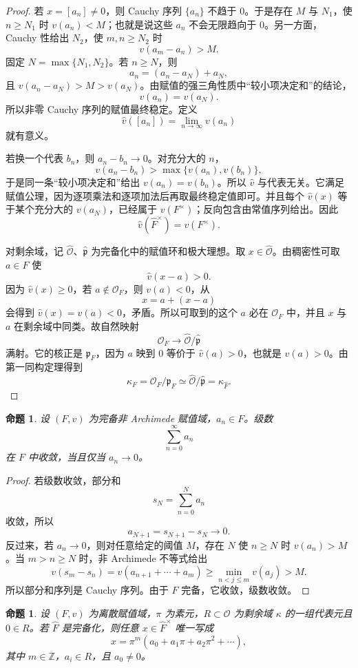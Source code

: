 \documentclass[11pt,a4paper,openany]{ctexbook}
\numberwithin{equation}{chapter}
\newcommand{\Z}{\mathbb{Z}}
\theoremstyle{plain}
\newtheorem{proposition}[theorem]{命题}
\theoremstyle{definition}
\theoremstyle{remark}
\begin{document}
\begin{proof}
若 $x=[a_n]\ne0$，则 Cauchy 序列 $\{a_n\}$ 不趋于 $0$。于是存在 $M$ 与 $N_1$，使 $n\ge N_1$ 时 $v(a_n)<M$；也就是说这些 $a_n$ 不会无限趋向于 $0$。另一方面，Cauchy 性给出 $N_2$，使 $m,n\ge N_2$ 时
\[
v(a_m-a_n)>M.
\]
固定 $N=\max\{N_1,N_2\}$。若 $n\ge N$，则
\[
a_n=(a_n-a_N)+a_N,
\]
且 $v(a_n-a_N)>M>v(a_N)$。由赋值的强三角性质中“较小项决定和”的结论，
\[
v(a_n)=v(a_N).
\]
所以非零 Cauchy 序列的赋值最终稳定。定义
\[
\widehat v([a_n])=\lim_{n\to\infty}v(a_n)
\]
就有意义。

若换一个代表 $b_n$，则 $a_n-b_n\to0$。对充分大的 $n$，
\[
v(a_n-b_n)>\max\{v(a_n),v(b_n)\},
\]
于是同一条“较小项决定和”给出 $v(a_n)=v(b_n)$。所以 $\widehat v$ 与代表无关。它满足赋值公理，因为逐项乘法和逐项加法后再取最终稳定值即可。并且每个
\(\widehat v(x)\) 等于某个充分大的 $v(a_N)$，已经属于 $v(F^\times)$；反向包含由常值序列给出。因此
\[
\widehat v(\widehat F^\times)=v(F^\times).
\]

对剩余域，记 $\widehat{\mathcal O}$、$\widehat{\mathfrak p}$ 为完备化中的赋值环和极大理想。取
$x\in\widehat{\mathcal O}$。由稠密性可取 $a\in F$ 使
\[
\widehat v(x-a)>0.
\]
因为 $\widehat v(x)\ge0$，若 $a\notin\mathcal O_F$，则 $v(a)<0$，从
\[
x=a+(x-a)
\]
会得到 $\widehat v(x)=v(a)<0$，矛盾。所以可取到的这个 $a$ 必在
\(\mathcal O_F\) 中，并且 $x$ 与 $a$ 在剩余域中同类。故自然映射
\[
\mathcal O_F\longrightarrow \widehat{\mathcal O}/\widehat{\mathfrak p}
\]
满射。它的核正是 $\mathfrak p_F$，因为 $a$ 映到 $0$ 等价于
\(\widehat v(a)>0\)，也就是 \(v(a)>0\)。由第一同构定理得到
\[
\kappa_F=\mathcal O_F/\mathfrak p_F\simeq
\widehat{\mathcal O}/\widehat{\mathfrak p}=\kappa_{\widehat F}.
\]
\end{proof}

\begin{proposition}
设 $(F,v)$ 为完备非 Archimede 赋值域，$a_n\in F$。级数
\[
\sum_{n=0}^\infty a_n
\]
在 $F$ 中收敛，当且仅当 $a_n\to0$。
\end{proposition}

\begin{proof}
若级数收敛，部分和
\[
s_N=\sum_{n=0}^N a_n
\]
收敛，所以
\[
a_{N+1}=s_{N+1}-s_N\to0.
\]
反过来，若 $a_n\to0$，则对任意给定的阈值 $M$，存在 $N$ 使 $n\ge N$ 时
$v(a_n)>M$。当 $m>n\ge N$ 时，非 Archimede 不等式给出
\[
v(s_m-s_n)
=v(a_{n+1}+\cdots+a_m)
\ge \min_{n<j\le m}v(a_j)>M.
\]
所以部分和序列是 Cauchy 序列。由于 $F$ 完备，它收敛，级数收敛。
\end{proof}

\begin{proposition}
设 $(F,v)$ 为离散赋值域，$\pi$ 为素元，$R\subset\mathcal O$ 为剩余域 $\kappa$ 的一组代表元且 $0\in R$。若 $\widehat F$ 是完备化，则任意 $x\in\widehat F^\times$ 唯一写成
\[
x=\pi^m(a_0+a_1\pi+a_2\pi^2+\cdots),
\]
其中 $m\in\Z$，$a_i\in R$，且 $a_0\ne0$。
\end{proposition}
\end{document}
